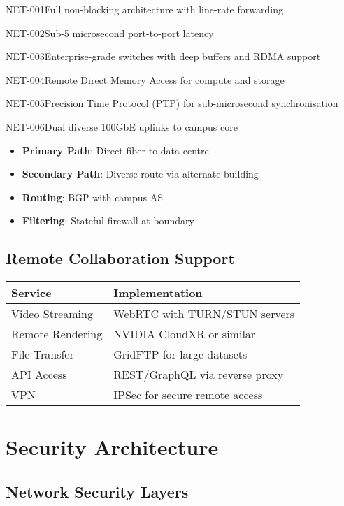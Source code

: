 \begin{requirement}{NET-001}{Full non-blocking architecture with line-rate forwarding}
\begin{requirement}{NET-002}{Sub-5 microsecond port-to-port latency}
\begin{requirement}{NET-003}{Enterprise-grade switches with deep buffers and RDMA support}
\begin{requirement}{NET-004}{Remote Direct Memory Access for compute and storage}
\begin{requirement}{NET-005}{Precision Time Protocol (PTP) for sub-microsecond synchronisation}
\begin{requirement}{NET-006}{Dual diverse 100GbE uplinks to campus core}
\begin{itemize}
    \item \textbf{Primary Path}: Direct fiber to data centre
    \item \textbf{Secondary Path}: Diverse route via alternate building
    \item \textbf{Routing}: BGP with campus AS
    \item \textbf{Filtering}: Stateful firewall at boundary
\end{itemize}

\subsection{Remote Collaboration Support}

\begin{table}[H]
\centering
\begin{tabularx}{\textwidth}{@{}lX@{}}
\toprule
\textbf{Service} & \textbf{Implementation} \\
\midrule
Video Streaming & WebRTC with TURN/STUN servers \\
Remote Rendering & NVIDIA CloudXR or similar \\
File Transfer & GridFTP for large datasets \\
API Access & REST/GraphQL via reverse proxy \\
VPN & IPSec for secure remote access \\
\bottomrule
\end{tabularx}
\end{table}

\section{Security Architecture}

\subsection{Network Security Layers}

\begin{figure}[H]
\centering
{}
\end{figure}
\end{requirement}
\end{requirement}
\end{requirement}
\end{requirement}
\end{requirement}
\end{requirement}
